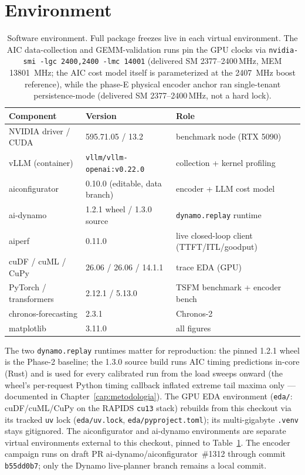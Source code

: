 \section{Environment}

\begin{table}[htbp]
\centering
\caption[Software environment for the thesis experiments]{Software
environment. Full package freezes live in each virtual environment. The AIC
data-collection and GEMM-validation runs pin the GPU clocks via
\texttt{nvidia-smi -lgc 2400,2400 -lmc 14001} (delivered SM
2377--2400\,\si{\mega\hertz}, MEM \SI{13801}{\mega\hertz}; the AIC cost model
itself is parameterized at the \SI{2407}{\mega\hertz} boost reference), while
the phase-E physical encoder anchor ran single-tenant persistence-mode
(delivered SM 2377--2400\,\si{\mega\hertz}, not a hard lock).}
\label{tab:ap-env}
\scriptsize
\setlength{\tabcolsep}{4pt}
\begin{tabular}{@{}lll@{}}
\toprule
Component & Version & Role \\
\midrule
NVIDIA driver / CUDA & 595.71.05 / 13.2 & benchmark node (RTX 5090) \\
vLLM (container) & \texttt{vllm/vllm-openai:v0.22.0} & collection + kernel profiling \\
aiconfigurator & 0.10.0 (editable, data branch) & encoder + LLM cost model \\
ai-dynamo & 1.2.1 wheel / 1.3.0 source & \texttt{dynamo.replay} runtime \\
aiperf & 0.11.0 & live closed-loop client (TTFT/ITL/goodput) \\
cuDF / cuML / CuPy & 26.06 / 26.06 / 14.1.1 & trace EDA (GPU) \\
PyTorch / transformers & 2.12.1 / 5.13.0 & TSFM benchmark + encoder bench \\
chronos-forecasting & 2.3.1 & Chronos-2 \\
matplotlib & 3.11.0 & all figures \\
\bottomrule
\end{tabular}
\end{table}

The two \texttt{dynamo.replay} runtimes matter for reproduction: the pinned
1.2.1 wheel is the Phase-2 baseline; the 1.3.0 source build runs AIC timing
predictions in-core (Rust) and is used for every calibrated run from the load
sweeps onward (the wheel's per-request Python timing callback inflated extreme
tail maxima only --- documented in Chapter~\ref{cap:metodologia}). The GPU EDA
environment (\texttt{eda/}: cuDF/cuML/CuPy on the RAPIDS \texttt{cu13} stack)
rebuilds from this checkout via its tracked \texttt{uv} lock
(\texttt{eda/\allowbreak uv.lock}, \texttt{eda/\allowbreak pyproject.toml});
its multi-gigabyte \texttt{.venv} stays gitignored. The aiconfigurator and
ai-dynamo environments are separate virtual environments external to this
checkout, pinned to Table~\ref{tab:ap-env}. The encoder campaign runs on draft
PR ai-dynamo/aiconfigurator~\#1312 through commit \texttt{b55dd0b7}; only the
Dynamo live-planner branch remains a local commit.

